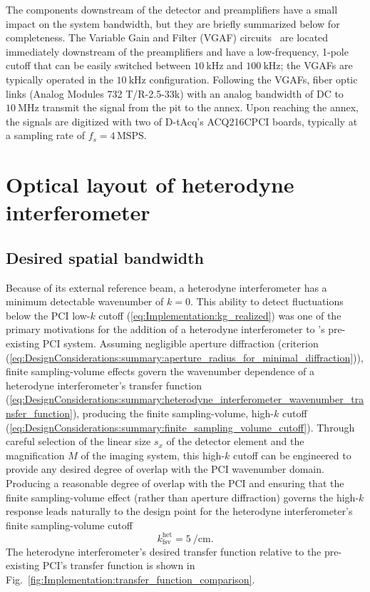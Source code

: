 The components downstream of the detector and preamplifiers
have a small impact on the system bandwidth, but
they are briefly summarized below for completeness.
The Variable Gain and Filter (VGAF) circuits~\cite[Sec.~3.3.3]{dorris_phd}
are located immediately downstream of the preamplifiers and
have a low-frequency, 1-pole cutoff that can be easily switched between
$\SI{10}{\kilo\hertz}$ and $\SI{100}{\kilo\hertz}$;
the VGAFs are typically operated in the $\SI{10}{\kilo\hertz}$ configuration.
Following the VGAFs,
fiber optic links (Analog Modules 732 T/R-2.5-33k)
with an analog bandwidth of DC to $\SI{10}{\mega\hertz}$
transmit the signal from the \diiid \space pit to the annex.
Upon reaching the annex,
the signals are digitized with two of D-tAcq's ACQ216CPCI boards,
typically at a sampling rate of $f_s = 4 \, \text{MSPS}$.


\section{Optical layout of heterodyne interferometer}


\subsection{Desired spatial bandwidth}
Because of its external reference beam, a heterodyne interferometer
has a minimum detectable wavenumber of $k = 0$.
This ability to detect fluctuations
below the PCI low-$k$ cutoff (\ref{eq:Implementation:kg_realized})
was one of the primary motivations
for the addition of a heterodyne interferometer
to \diiid's pre-existing PCI system.
Assuming negligible aperture diffraction
(criterion (\ref{eq:DesignConsiderations:summary:aperture_radius_for_minimal_diffraction})),
finite sampling-volume effects govern the wavenumber dependence
of a heterodyne interferometer's transfer function
(\ref{eq:DesignConsiderations:summary:heterodyne_interferometer_wavenumber_transfer_function}),
producing the finite sampling-volume, high-$k$ cutoff
(\ref{eq:DesignConsiderations:summary:finite_sampling_volume_cutoff}).
Through careful selection of
the linear size $s_x$ of the detector element
and the magnification $M$ of the imaging system,
this high-$k$ cutoff can be engineered
to provide any desired degree of overlap
with the PCI wavenumber domain.
Producing a reasonable degree of overlap with the PCI and
ensuring that the finite sampling-volume effect
(rather than aperture diffraction)
governs the high-$k$ response
leads naturally to the design point for
the heterodyne interferometer's finite sampling-volume cutoff
\begin{equation}
  k_{\text{fsv}}^{\text{het}} = \SI{5}{\per\centi\meter}.
  \label{eq:Implementation:kfsv_interferometer_design}
\end{equation}
The heterodyne interferometer's desired transfer function
relative to the pre-existing PCI's transfer function is shown in
Fig.~\ref{fig:Implementation:transfer_function_comparison}.

